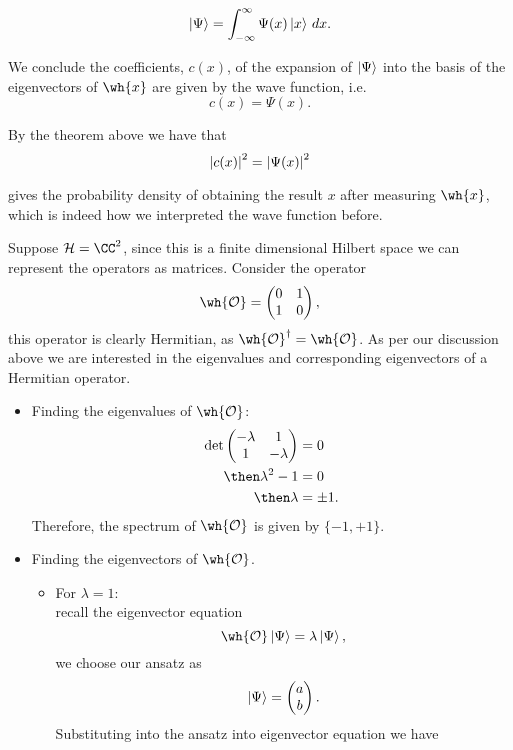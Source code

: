 \documentclass[12pt, a4paper]{article}
\begin{document}
\[\ket{\Psi} = \int_{-\infty}^{\infty} \Psi(x) \ket{x} \, dx.\]

We conclude the coefficients, \(c(x)\), of the expansion of \(\ket{\Psi}\) into the basis of the eigenvectors of \(\wh{x}\) are given by the wave function, i.e. 
\[c(x)= \Psi(x).\]

By the theorem above we have that 
\[\abs{c(x)}^2 = \abs{\Psi(x)}^2\]

gives the probability density of obtaining the result \(x\) after measuring \(\wh{x}\), which is indeed how we interpreted the wave function before.

\begin{example}
    Suppose \(\mathcal{H} =\CC^2\), since this is a finite dimensional Hilbert space we can represent the operators as matrices. Consider the operator 
    \[\wh{\mathcal{O}} = \begin{pmatrix} 0 & 1 \\ 1 & 0\end{pmatrix},\]
    this operator is clearly Hermitian, as \(\wh{\mathcal{O}}^{\dagger}=\wh{\mathcal{O}}\). As per our discussion above we are interested in the eigenvalues and corresponding eigenvectors of a Hermitian operator.
    \begin{itemize}
        \item Finding the eigenvalues of \(\wh{\mathcal{O}}\):
        \[\begin{aligned}
            \det\begin{pmatrix} -\lambda & 1 \\ 1 & -\lambda\end{pmatrix} &= 0 \\
            \then \lambda^2-1&=0 \\
            \then \lambda &= \pm 1.
        \end{aligned}\]
        Therefore, the spectrum of \(\wh{\mathcal{O}}\) is given by \(\{-1,+1\}\).
        \item Finding the eigenvectors of \(\wh{\mathcal{O}}\).
        \begin{itemize}
            \item For \(\lambda =1\):\\
            recall the eigenvector equation 
            \[\wh{\mathcal{O}} \ket{\Psi} = \lambda \ket{\Psi},\]
            we choose our ansatz as 
            \[\ket{\Psi} = \begin{pmatrix} a \\b\end{pmatrix}.\]
            Substituting into the ansatz into eigenvector equation we have

\end{itemize}
\end{itemize}
\end{example}
\end{document}
